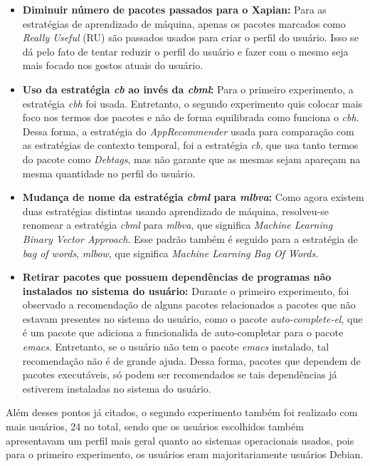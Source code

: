 \begin{itemize}
   \item \textbf{Diminuir número de pacotes passados para o Xapian:} Para as
   estratégias de aprendizado de máquina, apenas os pacotes marcados como
   \textit{Really Useful} (RU) são passados usados para criar o perfil do
   usuário. Isso se dá pelo fato de tentar reduzir o perfil do usuário e fazer
   com o mesmo seja mais focado nos gostos atuais do usuário.

   \item \textbf{Uso da estratégia \textit{cb} ao invés da \textit{cbml}:} Para
   o primeiro experimento, a estratégia \textit{cbh} foi usada. Entretanto,
   o segundo experimento quis colocar mais foco nos termos dos pacotes e
   não de forma equilibrada como funciona o \textit{cbh}. Dessa forma,
   a estratégia do \textit{AppRecommender} usada para comparação com as
   estratégias de contexto temporal, foi a estratégia \textit{cb}, que usa
   tanto termos do pacote como \textit{Debtags}, mas não garante que as mesmas sejam
   apareçam na mesma quantidade no perfil do usuário.

   \item \textbf{Mudança de nome da estratégia \textit{cbml} para
   \textit{mlbva}:} Como agora existem duas estratégias distintas usando
   aprendizado de máquina, resolveu-se renomear a estratégia \textit{cbml}
   para \textit{mlbva}, que significa \textit{Machine Learning Binary
   Vector Approach}. Esse padrão também é seguido para a estratégia de
   \textit{bag of words}, \textit{mlbow}, que significa \textit{Machine
   Learning Bag Of Words}.

   \item \textbf{Retirar pacotes que possuem dependências de programas não
   instalados no sistema do usuário:} Durante o primeiro experimento, foi
   observado a recomendação de alguns pacotes relacionados a pacotes que não
   estavam presentes no sistema do usuário, como o pacote
   \textit{auto-complete-el}, que é um pacote que adiciona a funcionalida
   de auto-completar para o pacote \textit{emacs}. Entretanto, se o usuário
   não tem o pacote \textit{emacs} instalado, tal recomendação não é de
   grande ajuda. Dessa forma, pacotes que dependem de pacotes executáveis,
   só podem ser recomendados se tais dependências já estiverem instaladas
   no sistema do usuário.

\end{itemize}

Além desses pontos já citados, o segundo experimento também foi realizado com
mais usuários, 24 no total, sendo que os usuários escolhidos também apresentavam
um perfil mais geral quanto ao sistemas operacionais usados, pois para o
primeiro experimento, os usuários eram majoritariamente usuários Debian.

